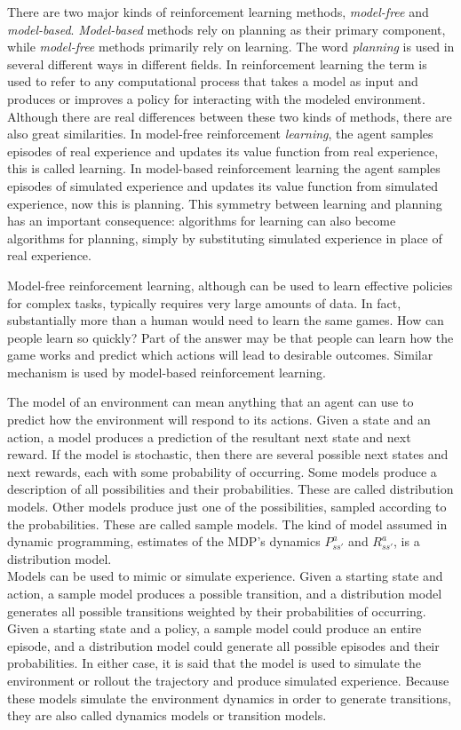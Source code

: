 There are two major kinds of reinforcement learning methods, \textit{model-free} and \textit{model-based}. \textit{Model-based} methods rely on planning as their primary component, while \textit{model-free} methods primarily rely on learning. The word \textit{planning} is used in several different ways in different fields. In reinforcement learning the term is used to refer to any computational process that takes a model as input and produces or improves a policy for interacting with the modeled environment. \\
Although there are real differences between these two kinds of methods, there are also great similarities. In model-free reinforcement \textit{learning}, the agent samples episodes of real experience and updates its value function from real experience, this is called learning. In model-based reinforcement learning the agent samples episodes of simulated experience and updates its value function from simulated experience, now this is planning. This symmetry between learning and planning has an important consequence: algorithms for learning can also become algorithms for planning, simply by substituting simulated experience in place of real experience.

Model-free reinforcement learning, although can be used to learn effective policies for complex tasks, typically requires very large amounts of data. In fact, substantially more than a human would need to learn the same games. How can people learn so quickly? Part of the answer may be that people can learn how the game works and predict which actions will lead to desirable outcomes. Similar mechanism is used by model-based reinforcement learning.

The model of an environment can mean anything that an agent can use to predict how the environment will respond to its actions. Given a state and an action, a model produces a prediction of the resultant next state and next reward. If the model is stochastic, then there are several possible next states and next rewards, each with some probability of occurring. Some models produce a description of all possibilities and their probabilities. These are called distribution models. Other models produce just one of the possibilities, sampled according to the probabilities. These are called sample models. The kind of model assumed in dynamic programming, estimates of the MDP’s dynamics $P^a_{ss'}$ and $R^a_{ss'}$, is a distribution model. \\
Models can be used to mimic or simulate experience. Given a starting state and action, a sample model produces a possible transition, and a distribution model generates all possible transitions weighted by their probabilities of occurring. Given a starting state and a policy, a sample model could produce an entire episode, and a distribution model could generate all possible episodes and their probabilities. In either case, it is said that the model is used to simulate the environment or rollout the trajectory and produce simulated experience. Because these models simulate the environment dynamics in order to generate transitions, they are also called dynamics models or transition models.

